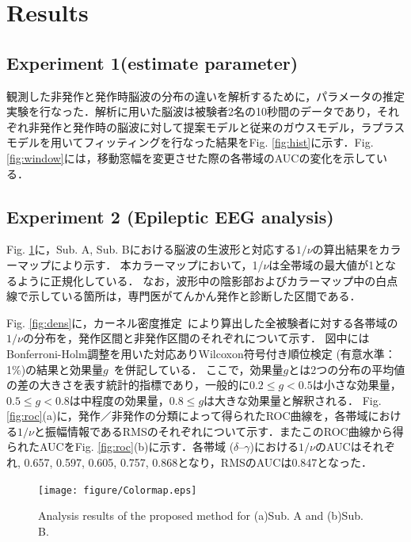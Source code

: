 \documentclass[journal]{IEEEtran}
\begin{document}
\section{Results}
\subsection{Experiment 1(estimate parameter)}
観測した非発作と発作時脳波の分布の違いを解析するために，パラメータの推定実験を行なった．解析に用いた脳波は被験者2名の10秒間のデータであり，それぞれ非発作と発作時の脳波に対して提案モデルと従来のガウスモデル，ラプラスモデルを用いてフィッティングを行なった結果をFig. \ref{fig:hist}に示す．Fig. \ref{fig:window}には，移動窓幅を変更させた際の各帯域のAUCの変化を示している．

\subsection{Experiment 2 (Epileptic EEG analysis)}
Fig. \ref{fig:Colormap}に，Sub. A, Sub. Bにおける脳波の生波形と対応する$1/\nu$の算出結果をカラーマップにより示す．
本カラーマップにおいて，1/$\nu$は全帯域の最大値が1となるように正規化している．
なお，波形中の陰影部およびカラーマップ中の白点線で示している箇所は，専門医がてんかん発作と診断した区間である．

Fig. \ref{fig:dens}に，カーネル密度推定~\cite{Parzen1962}により算出した全被験者に対する各帯域の$1/\nu$の分布を，発作区間と非発作区間のそれぞれについて示す．
図中にはBonferroni-Holm調整を用いた対応ありWilcoxon符号付き順位検定 (有意水準：1\%)の結果と効果量$g$~\cite{Hedges1981}を併記している．
ここで，効果量$g$とは2つの分布の平均値の差の大きさを表す統計的指標であり，一般的に$0.2 \leq g < 0.5$は小さな効果量，$0.5 \leq g < 0.8$は中程度の効果量，$0.8 \leq g$は大きな効果量と解釈される．
Fig. \ref{fig:roc}(a)に，発作／非発作の分類によって得られたROC曲線を，各帯域における$1/\nu$と振幅情報であるRMSのそれぞれについて示す．またこのROC曲線から得られたAUCをFig. \ref{fig:roc}(b)に示す．各帯域 ($\delta$--$\gamma$)における$1/\nu$のAUCはそれぞれ, 0.657, 0.597, 0.605, 0.757, 0.868となり，RMSのAUCは0.847となった．

\begin{figure}[!t]
\centering
\texttt{[image: figure/Colormap.eps]}
\caption{Analysis results of the proposed method for (a)Sub. A and (b)Sub. B.}
\label{fig:Colormap}
\end{figure}
\end{document}
